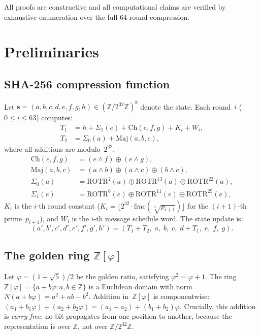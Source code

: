 \documentclass[12pt, a4paper]{article}
\theoremstyle{plain}
\theoremstyle{definition}
\newcommand{\Z}{\mathbb{Z}}
\newcommand{\Ch}{\mathrm{Ch}}
\newcommand{\Maj}{\mathrm{Maj}}
\newcommand{\rotr}{\mathrm{ROTR}}
\newcommand{\vp}{\varphi}
\newcommand{\Zphi}{\Z[\vp]}
\begin{document}
All proofs are constructive and all computational claims are
verified by exhaustive enumeration over the full 64-round
compression.

\section{Preliminaries}\label{sec:prelim}

\subsection{SHA-256 compression function}

Let $\mathbf{s}=(a,b,c,d,e,f,g,h)\in(\Z/2^{32}\Z)^{8}$ denote
the state.
Each round~$i$ ($0\le i\le 63$) computes:
\begin{align}
  T_{1} &= h + \Sigma_{1}(e) + \Ch(e,f,g) + K_{i} + W_{i},\label{eq:T1}\\
  T_{2} &= \Sigma_{0}(a) + \Maj(a,b,c),\label{eq:T2}
\end{align}
where all additions are modulo~$2^{32}$,
\begin{align}
  \Ch(e,f,g) &= (e\wedge f)\oplus(\overline{e}\wedge g),\label{eq:ch}\\
  \Maj(a,b,c) &= (a\wedge b)\oplus(a\wedge c)\oplus(b\wedge c),\label{eq:maj}\\
  \Sigma_{0}(a) &= \rotr^{2}(a)\oplus\rotr^{13}(a)\oplus\rotr^{22}(a),\label{eq:sigma0}\\
  \Sigma_{1}(e) &= \rotr^{6}(e)\oplus\rotr^{11}(e)\oplus\rotr^{25}(e),\label{eq:sigma1}
\end{align}
$K_{i}$ is the $i$-th round constant
($K_{i}=\lfloor 2^{32}\cdot\mathrm{frac}(\sqrt[3]{p_{i+1}})\rfloor$
for the $(i+1)$-th prime~$p_{i+1}$), and $W_{i}$ is the $i$-th
message schedule word.
The state update is:
\begin{equation}\label{eq:round}
  (a',b',c',d',e',f',g',h')
  = (T_{1}+T_{2},\;a,\;b,\;c,\;d+T_{1},\;e,\;f,\;g).
\end{equation}

\subsection{The golden ring \texorpdfstring{$\Zphi$}{Z[phi]}}

Let $\vp=(1+\sqrt{5})/2$ be the golden ratio, satisfying
$\vp^{2}=\vp+1$.
The ring $\Zphi=\{a+b\vp:a,b\in\Z\}$ is a Euclidean domain
with norm $N(a+b\vp)=a^{2}+ab-b^{2}$.
Addition in~$\Zphi$ is componentwise:
$(a_{1}+b_{1}\vp)+(a_{2}+b_{2}\vp)=(a_{1}+a_{2})+(b_{1}+b_{2})\vp$.
Crucially, this addition is \emph{carry-free}: no bit propagates
from one position to another, because the representation is over
$\Z$, not over $\Z/2^{32}\Z$.
\end{document}
